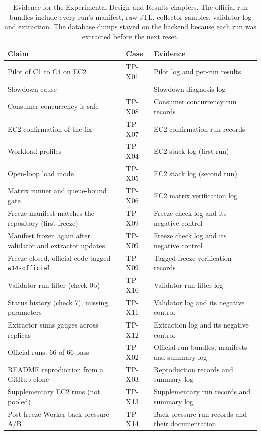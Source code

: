 \documentclass[a4paper]{report}
\begin{document}
\begin{table}[H]
\centering
\scriptsize
\begin{tabular}{@{}>{\raggedright\arraybackslash}p{}l>{\raggedright\arraybackslash}p{}@{}}
\toprule
Claim & Case & Evidence \\
\midrule
Pilot of C1 to C4 on EC2 & TP-X01 & Pilot log and per-run results \\
Slowdown cause & --- & Slowdown diagnosis log \\
Consumer concurrency is safe & TP-X08 & Consumer concurrency run records \\
EC2 confirmation of the fix & TP-X07 & EC2 confirmation run records \\
Workload profiles & TP-X04 & EC2 stack log (first run) \\
Open-loop load mode & TP-X05 & EC2 stack log (second run) \\
Matrix runner and queue-bound gate & TP-X06 & EC2 matrix verification log \\
Freeze manifest matches the repository (first freeze) & TP-X09 &
  Freeze check log and its negative control \\
Manifest frozen again after validator and extractor updates & TP-X09 &
  Freeze check log and its negative control \\
Freeze closed, official code tagged \texttt{w14-official} & TP-X09 &
  Tagged-freeze verification records \\
Validator run filter (check 0b) & TP-X10 & Validator run filter log \\
Status history (check 7), missing parameters & TP-X11 &
  Validator log and its negative control \\
Extractor sums gauges across replicas & TP-X12 &
  Extraction log and its negative control \\
Official runs: 66 of 66 pass & TP-X02 &
  Official run bundles, manifests and summary log \\
README reproduction from a GitHub clone & TP-X03 &
  Reproduction records and summary log \\
Supplementary EC2 runs (not pooled) & TP-X13 &
  Supplementary run records and summary log \\
Post-freeze Worker back-pressure A/B & TP-X14 &
  Back-pressure run records and their documentation \\
\bottomrule
\end{tabular}
\caption{Evidence for the Experimental Design and Results chapters. The
official run bundles include every run's manifest, raw JTL, collector samples,
validator log and extraction. The database dumps stayed on the backend because
each run was extracted before the next reset.}
\label{tab:app-evidence}
\end{table}
\end{document}

